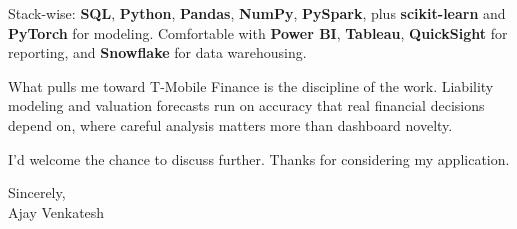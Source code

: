 \documentclass[letterpaper,11pt]{article}
\begin{document}
Stack-wise: \textbf{SQL}, \textbf{Python}, \textbf{Pandas}, \textbf{NumPy}, \textbf{PySpark}, plus \textbf{scikit-learn} and \textbf{PyTorch} for modeling. Comfortable with \textbf{Power BI}, \textbf{Tableau}, \textbf{QuickSight} for reporting, and \textbf{Snowflake} for data warehousing.

What pulls me toward T-Mobile Finance is the discipline of the work. Liability modeling and valuation forecasts run on accuracy that real financial decisions depend on, where careful analysis matters more than dashboard novelty.

I'd welcome the chance to discuss further. Thanks for considering my application.

\vspace{12pt}
Sincerely, \\
Ajay Venkatesh
\end{document}
